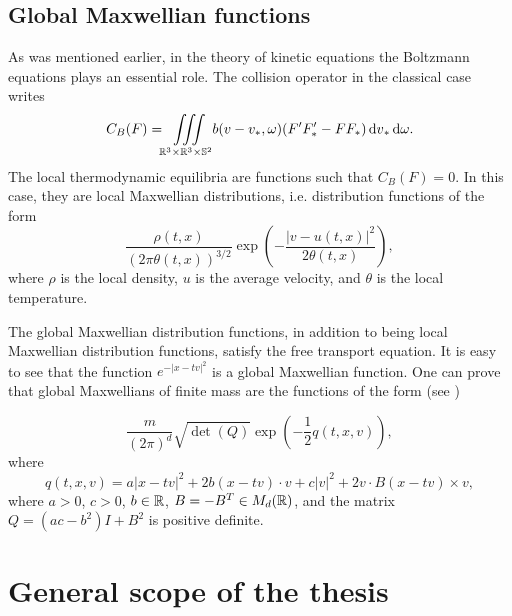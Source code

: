 
\subsection{Global Maxwellian functions} %
\label{sub:global_maxwellian_functions}
	As was mentioned earlier, in the theory of kinetic equations the Boltzmann equations plays an essential role. The collision operator in the classical case writes 
\[C_B(F)={\iiint\limits_{\mathbb R^3\times\mathbb R^3\times\mathbb S^2}} b(v-v_*,\omega)(F'F'_*-FF_*){\,\mathrm{d} v}_*{\,\mathrm{d} \omega}.\]
The local thermodynamic equilibria are functions such that $C_B(F)=0$. In this case, they are local Maxwellian distributions, i.e. distribution functions of the form
\begin{equation}
	\label{eq:i:maxw}
	 \frac{\rho(t,x)}{(2\pi \theta(t,x))^{3/2}} \exp\left( -\frac{|v-u(t,x)|^2}{2 \theta(t,x)}\right),
\end{equation}
where $\rho$ is the local density, $u$ is the average velocity, and $\theta$ is the local temperature. 

The global Maxwellian distribution functions, in addition to being local Maxwellian distribution functions, satisfy the free transport equation. It is easy to see that the function $e^{-|x-tv|^2}$ is a global Maxwellian function. One can prove that global Maxwellians of finite mass are the functions of the form (see \cite{CDL-GlM})

\[\frac{m}{(2 \pi)^d} \sqrt{\det (Q)}\exp\left(-\frac{1}{2}q(t,x,v)\right),\]
where
\[q(t,x,v) = a|x-tv|^2+2b (x-tv)\cdot v+c|v|^2 + 2v\cdot B(x-tv)\times v,\]
where $a>0$, $c>0$, $b\in{\mathbb {R}}$, $B=-B^T\in M_d({\mathbb {R}})$, and the matrix $Q=(ac-b^2)I+B^2$ is positive definite.











\section{General scope of the thesis} %
\label{sec:general_scope_of_the_thesis}

